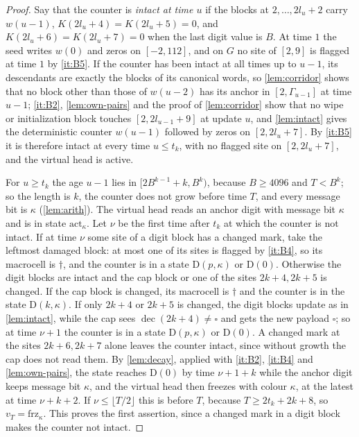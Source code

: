 \documentclass[11pt]{article}
\theoremstyle{plain}
\theoremstyle{definition}
\theoremstyle{remark}
\newcommand{\blank}{\square}
\newcommand{\inv}{\dagger}
\newcommand{\act}{\mathrm{act}}
\newcommand{\frz}{\mathrm{frz}}
\newcommand{\dec}{\operatorname{dec}}
\begin{document}
\begin{proof}
Say that the counter is \emph{intact at time $u$} if the blocks at $2,\dots,2l_u+2$ carry $w(u-1)$, $K(2l_u+4)=K(2l_u+5)=0$, and $K(2l_u+6)=K(2l_u+7)=0$ when the last digit value is $B$. At time $1$ the seed writes $w(0)$ and zeros on $[-2,112]$, and on $G$ no site of $[2,9]$ is flagged at time $1$ by \ref{it:B5}. If the counter has been intact at all times up to $u-1$, its descendants are exactly the blocks of its canonical words, so \cref{lem:corridor} shows that no block other than those of $w(u-2)$ has its anchor in $[2,\Gamma_{u-1}]$ at time $u-1$; \ref{it:B2}, \cref{lem:own-pairs} and the proof of \cref{lem:corridor} show that no wipe or initialization block touches $[2,2l_{u-1}+9]$ at update $u$, and \cref{lem:intact} gives the deterministic counter $w(u-1)$ followed by zeros on $[2,2l_u+7]$. By \ref{it:B5} it is therefore intact at every time $u\le t_k$, with no flagged site on $[2,2l_u+7]$, and the virtual head is active.

For $u\ge t_k$ the age $u-1$ lies in $[2B^{k-1}+k,B^k)$, because $B\ge4096$ and $T<B^k$; so the length is $k$, the counter does not grow before time $T$, and every message bit is $\kappa$ (\cref{lem:arith}). The virtual head reads an anchor digit with message bit $\kappa$ and is in state $\act_\kappa$. Let $\nu$ be the first time after $t_k$ at which the counter is not intact. If at time $\nu$ some site of a digit block has a changed mark, take the leftmost damaged block: at most one of its sites is flagged by \ref{it:B4}, so its macrocell is $\inv$, and the counter is in a state $\mathrm D(p,\kappa)$ or $\mathrm D(0)$. Otherwise the digit blocks are intact and the cap block or one of the sites $2k+4,2k+5$ is changed. If the cap block is changed, its macrocell is $\inv$ and the counter is in the state $\mathrm D(k,\kappa)$. If only $2k+4$ or $2k+5$ is changed, the digit blocks update as in \cref{lem:intact}, while the cap sees $\dec(2k+4)\ne\blank$ and gets the new payload $\blank$; so at time $\nu+1$ the counter is in a state $\mathrm D(p,\kappa)$ or $\mathrm D(0)$. A changed mark at the sites $2k+6,2k+7$ alone leaves the counter intact, since without growth the cap does not read them. By \cref{lem:decay}, applied with \ref{it:B2}, \ref{it:B4} and \cref{lem:own-pairs}, the state reaches $\mathrm D(0)$ by time $\nu+1+k$ while the anchor digit keeps message bit $\kappa$, and the virtual head then freezes with colour $\kappa$, at the latest at time $\nu+k+2$. If $\nu\le\lfloor T/2\rfloor$ this is before $T$, because $T\ge2t_k+2k+8$, so $v_T=\frz_\kappa$. This proves the first assertion, since a changed mark in a digit block makes the counter not intact.


\end{proof}
\end{document}
